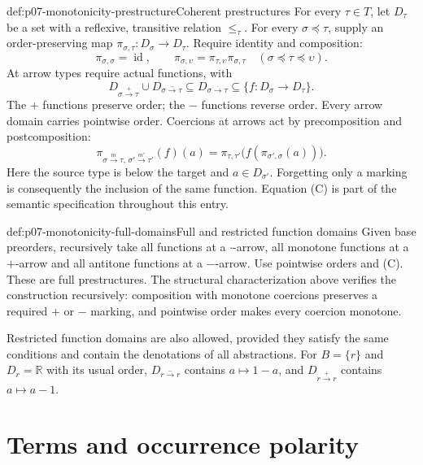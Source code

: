 \begin{hbdefinition}{def:p07-monotonicity-prestructure}{Coherent prestructures}
For every \(\tau\in T\), let \(D_\tau\) be a set with a reflexive,
transitive relation \(\leq_\tau\). For every \(\sigma\preceq\tau\), supply
an order-preserving map \(\pi_{\sigma,\tau}:D_\sigma\to D_\tau\).
Require identity and composition:
\[
 \pi_{\sigma,\sigma}=\operatorname{id},\qquad
 \pi_{\sigma,\upsilon}=\pi_{\tau,\upsilon}\pi_{\sigma,\tau}
 \quad(\sigma\preceq\tau\preceq\upsilon).
\]
At arrow types require actual functions, with
\[
 D_{\sigma\xrightarrow+\tau}\cup D_{\sigma\xrightarrow-\tau}
 \subseteq D_{\sigma\xrightarrow{\cdot}\tau}
 \subseteq \{f:D_\sigma\to D_\tau\}.
\]
The \(+\) functions preserve order; the \(-\) functions reverse order.
Every arrow domain carries pointwise order. Coercions at arrows act by
precomposition and postcomposition:
\[
 \pi_{\sigma\xrightarrow m\tau,\,
       \sigma'\xrightarrow{m'}\tau'}(f)(a)
 =
 \pi_{\tau,\tau'}\bigl(f(\pi_{\sigma',\sigma}(a))\bigr).
 \tag{C}
\]
Here the source type is below the target and \(a\in D_{\sigma'}\).
Forgetting only a marking is consequently the inclusion of the same
function. Equation (C) is part of the semantic specification throughout
this entry.
\end{hbdefinition}

\begin{hbexample}{def:p07-monotonicity-full-domains}{Full and restricted function domains}
Given base preorders, recursively take all functions at a \(\cdot\)-arrow,
all monotone functions at a \(+\)-arrow and all antitone functions at a
\(-\)-arrow. Use pointwise orders and (C). These are full prestructures.
The structural characterization above verifies the construction recursively:
composition with monotone coercions preserves a required \(+\) or \(-\)
marking, and pointwise order makes every coercion monotone.

Restricted function domains are also allowed, provided they satisfy the
same conditions and contain the denotations of all abstractions.
For \(B=\{r\}\) and \(D_r=\mathbb R\) with its usual order,
\(D_{r\xrightarrow-\!r}\) contains \(a\mapsto 1-a\), and
\(D_{r\xrightarrow+\!r}\) contains \(a\mapsto a-1\).
\end{hbexample}

\section{Terms and occurrence polarity}

